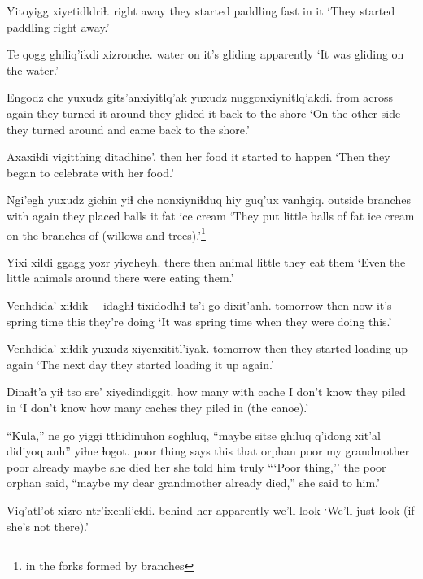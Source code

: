 \documentclass[12pt]{article}
\begin{document}
\gll Yitoyigg  {xiyetidldriɬ.}         
{right away} {they started paddling fast in it} 
\glt `They started paddling right away.'
\glend

\gll Te qogg ghiliq'ikdi xizronche.
water on {it's gliding} apparently
\glt `It was gliding on the water.'
\glend

\gll Engodz che yuxudz  gits'anxiyitlq'ak     yuxudz nuggonxiynitlq'akdi.
{from across} again {} {they turned it around} {} {they glided it back to the shore}
\glt `On the other side they turned around and came back to the shore.'
\glend

\gll Axaxiɬdi vigitthing ditadhine'.
then     {her food} {it started to happen}
\glt `Then they began to celebrate with her food.'
\glend

\gll Ngi'egh yuxudz gichin   yiɬ  che   nonxiyniɬduq hiy guq'ux  vanhgiq.
outside  {}   branches with again  {they placed balls} it fat {ice cream}
\glt `They put little balls of fat ice cream on the branches of (willows and trees).'\footnote{in the forks formed by branches}
\glend

\gll Yixi  xiɬdi ggagg  yozr   yiyeheyh.
there     then  animal little {they eat them}
\glt `Even the little animals around there were eating them.'
\glend

\gll Venhdida' xiɬdik--- idaghɬ tixidodhiɬ       ts'i go   dixit'anh.
tomorrow  then      now    {it's spring time} {} this {they're doing}
\glt `It was spring time when they were doing this.'
\glend

\gll Venhdida' xiɬdik yuxudz xiyenxititl'iyak.
tomorrow  then   {}     {they started loading up again}
\glt `The next day they started loading it up again.'
\glend

\gll Dinaɬt'a yiɬ tso   sre'         xiyedindiggit.
{how many} with cache {I don't know} {they piled in}
\glt `I don't know how many caches they piled in (the canoe).'
\glend

\gll ``Kula,''       ne   go   yiggi tthidinuhon soghluq, ``maybe  sitse          ghiluq q'idong xit'al didiyoq  anh'' yiɬne        ɬogot.
{poor thing} says this that  orphan      poor    {}  {my grandmother} poor   already maybe  {she died} her {she told him } truly
\glt ```Poor thing,'' the poor orphan said, ``maybe my dear grandmother already died,'' she said to him.'
\glend

\gll Viq'atl'ot xizro ntr'ixenli'eɬdi.
{behind her}  apparently  {we'll look}
\glt `We'll just look (if she's not there).'
\glend
\end{document}
